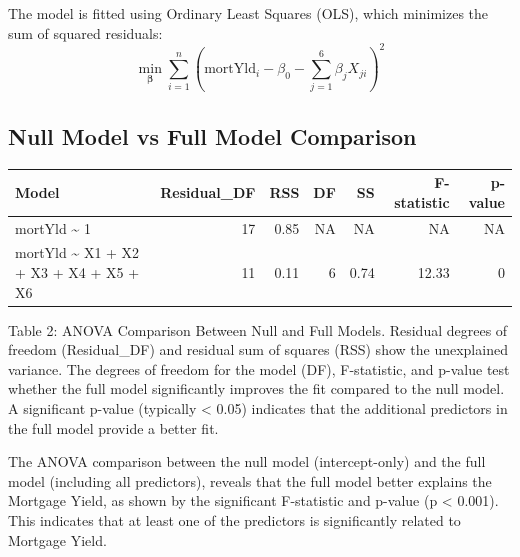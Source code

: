 \documentclass[
  12pt,
]{article}
\begin{document}
\vspace{0.2cm}

The model is fitted using Ordinary Least Squares (OLS), which minimizes
the sum of squared residuals:\\
\vspace{-0.2cm} \[
\min_{\boldsymbol\beta} \sum_{i=1}^n \left( \text{mortYld}_i - \beta_0 - \sum_{j=1}^6 \beta_j X_{ji} \right)^2
\] \vspace{-0.3cm}

\subsection{Null Model vs Full Model
Comparison}\label{null-model-vs-full-model-comparison}

\begin{table}[!h]
\centering\begingroup\fontsize{8}{10}\selectfont

\begin{tabular}{lrrrrrr}
\toprule
Model & Residual\_DF & RSS & DF & SS & F-statistic & p-value\\
\midrule
mortYld \textasciitilde{} 1 & 17 & 0.85 & NA & NA & NA & NA\\
mortYld \textasciitilde{} X1 + X2 + X3 + X4 + X5 + X6 & 11 & 0.11 & 6 & 0.74 & 12.33 & 0\\
\bottomrule
\end{tabular}
\endgroup{}
\end{table}
\vspace{-0.2em}

\noindent \fontsize{12}{14}\selectfont Table 2: ANOVA Comparison Between
Null and Full Models. Residual degrees of freedom (Residual\_DF) and
residual sum of squares (RSS) show the unexplained variance. The degrees
of freedom for the model (DF), F-statistic, and p-value test whether the
full model significantly improves the fit compared to the null model. A
significant p-value (typically \textless{} 0.05) indicates that the
additional predictors in the full model provide a better fit.

\par

\vspace{1cm}

The ANOVA comparison between the null model (intercept-only) and the
full model (including all predictors), reveals that the full model
better explains the Mortgage Yield, as shown by the significant
F-statistic and p-value (p \textless{} 0.001). This indicates that at
least one of the predictors is significantly related to Mortgage Yield.
\end{document}
